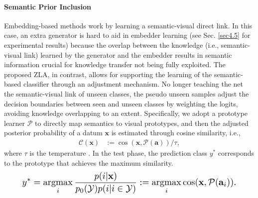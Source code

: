 \documentclass{article}
\DeclareMathOperator*{\argmax}{argmax}
\begin{document}
\paragraph{Semantic Prior Inclusion}
Embedding-based methods \cite{li2019rethinking,skorokhodov2020class} work by learning a semantic-visual direct link. In this case, an extra generator is hard to aid in embedder learning (see Sec. \ref{sec4.5} for experimental results) because the overlap between the knowledge (i.e., semantic-visual link) learned by the generator and the embedder results in semantic information crucial for knowledge transfer not being fully exploited. The proposed ZLA, in contrast, allows for supporting the learning of the semantic-based classifier through an adjustment mechanism. No longer teaching the net the semantic-visual link of unseen classes, the pseudo unseen samples adjust the decision boundaries between seen and unseen classes by weighting the logits, avoiding knowledge overlapping to an extent. Specifically, we adopt a prototype learner $\mathcal{P}$ \cite{li2019rethinking,skorokhodov2020class} to directly map semantics to visual prototypes, and then the adjusted posterior probability of a datum $\mathbf{x}$ is estimated through cosine similarity, i.e.,
\vspace{-1ex}
	\begin{equation}
\displaystyle
    \begin{aligned}
    \mathcal{C}(\mathbf{x})&:=\cos(\mathbf{x},\mathcal{P}(\mathbf{a}))/\tau  ,
\end{aligned}
\label{eq15}
	\end{equation}
	where $\tau$ is the temperature \cite{hinton2015distilling}. In the test phase, the prediction class $y^*$ corresponds to the prototype that achieves the maximum similarity.
	\begin{equation}
	\resizebox{0.89\linewidth}{!}{$
	\displaystyle
	y^*=\argmax_i\frac{p(i|\mathbf{x})}{p_0(\mathcal{Y})p(i|i \in \mathcal{Y})}:=\argmax_i \cos(\mathbf{x},\mathcal{P}(\mathbf{a}_i)).
	 $}
    \label{eq16}
	\end{equation}
\end{document}
